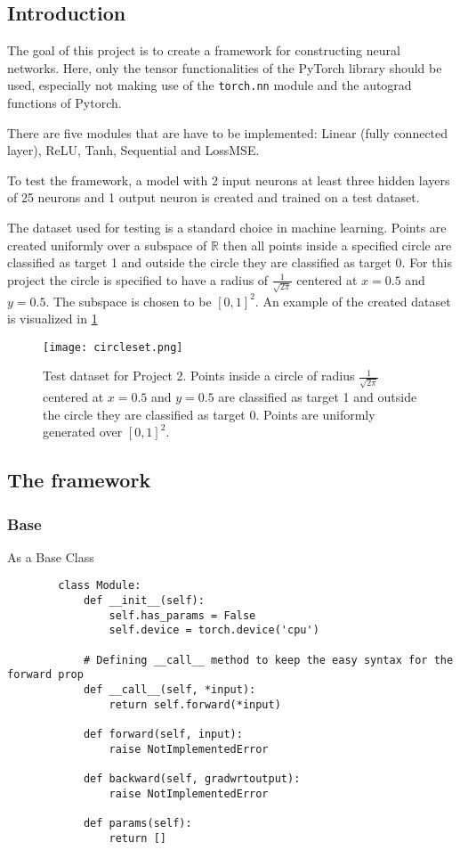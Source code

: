 \documentclass[11pt,english]{article}
\begin{document}
	\subsection{Introduction} \label{ssec:Intro2}
	The goal of this project is to create a framework for constructing neural networks. Here, only the tensor functionalities of the PyTorch library should be used, especially not making use of the \lstinline|torch.nn| module and the autograd functions of Pytorch.
	
	There are five modules that are have to be implemented: Linear (fully connected layer), ReLU, Tanh, Sequential and LossMSE.
	
	To test the framework, a model with 2 input neurons at least three hidden layers of 25 neurons and 1 output neuron is created and trained on a test dataset. 
	
	The dataset used for testing is a standard choice in machine learning. Points are created uniformly over a subspace of $\mathbb{R}$ then all points inside a specified circle are classified as target 1 and outside the circle they are classified as target 0. For this project the circle is specified to have a radius of $\frac{1}{\sqrt{2 \pi}}$ centered at $x=0.5$ and $y=0.5$. The subspace is chosen to be $[0, 1]^2$. An example of the created dataset is visualized in \cref{fig:circleset}
	
	\begin{figure}[H]
		\centering
		\texttt{[image: 
			circleset.png]}
		\caption{Test dataset for Project 2. Points inside a circle of radius $\frac{1}{\sqrt{2 \pi}}$ centered at $x=0.5$ and $y=0.5$ are classified as target 1 and outside the circle they are classified as target 0. Points are uniformly generated over $[0, 1]^2$.}
		\label{fig:circleset}
	\end{figure}  
	
	\subsection{The framework} \label{ssec:framework}
	
	\subsubsection{Base}
	
	As a Base Class 
	
	\begin{lstlisting}
		class Module:
			def __init__(self):
				self.has_params = False
				self.device = torch.device('cpu')
			
			# Defining __call__ method to keep the easy syntax for the forward prop
			def __call__(self, *input):
				return self.forward(*input)
			
			def forward(self, input):
				raise NotImplementedError
			
			def backward(self, gradwrtoutput):
				raise NotImplementedError
			
			def params(self):
				return []
	\end{lstlisting}
	
\end{document}

